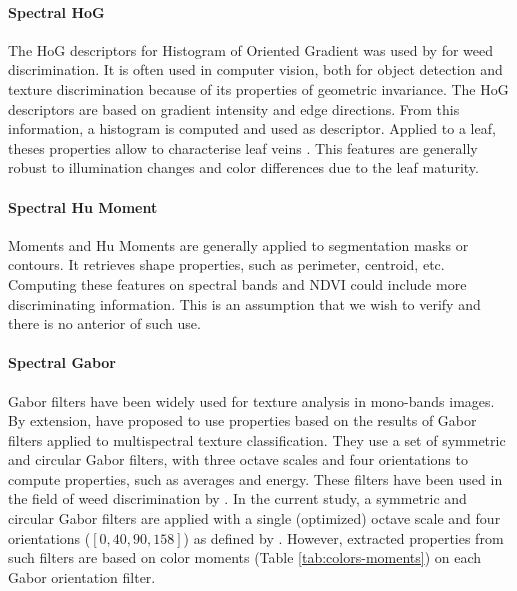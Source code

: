 \documentclass[../thesis.tex]{subfiles}
\begin{document}
    \newpage
    \paragraph{Spectral HoG} The HoG descriptors for Histogram of Oriented Gradient was used by \cite{saha2017development} for weed discrimination. It is often used in computer vision, both for object detection and texture discrimination because of its properties of geometric invariance. The HoG descriptors are based on gradient intensity and edge directions. From this information, a histogram is computed and used as descriptor. Applied to a leaf, theses properties allow to characterise leaf veins \cite{tsolakidis2014plant}. This features are generally robust to illumination changes and color differences due to the leaf maturity.
    
    \paragraph{Spectral Hu Moment} Moments and Hu Moments are generally applied to segmentation masks or contours. It retrieves shape properties, such as perimeter, centroid, etc. Computing these features on spectral bands and NDVI could include more discriminating information. This is an assumption that we wish to verify and there is no anterior of such use.
    
    
    \paragraph{Spectral Gabor} Gabor filters have been widely used for texture analysis in mono-bands images. By extension, \cite{650858} have proposed to use properties based on the results of Gabor filters applied to multispectral texture classification. They use a set of symmetric and circular Gabor filters, with three octave scales and four orientations to compute properties, such as averages and energy. These filters have been used in the field of weed discrimination by \cite{Ishak2009}. In the current study, a symmetric and circular Gabor filters are applied with a single (optimized) octave scale and four orientations ($[0,40,90,158]$) as defined by \cite{650858}. However, extracted properties from such filters are based on color moments (Table \ref{tab:colors-moments}) on each Gabor orientation filter.
    
\end{document}
